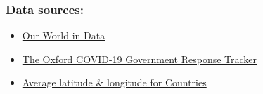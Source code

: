 \documentclass[
]{article}
\providecommand{\tightlist}{%
  \setlength{\itemsep}{0pt}\setlength{\parskip}{0pt}}
\begin{document}
\hypertarget{data-sources}{%
\subsubsection{Data sources:}\label{data-sources}}

\begin{itemize}
\tightlist
\item
  \href{https://covid.ourworldindata.org/data/owid-covid-data.csv}{Our
  World in Data}
\item
  \href{https://raw.githubusercontent.com/OxCGRT/covid-policy-tracker/master/data/OxCGRT_latest.csv}{The
  Oxford COVID-19 Government Response Tracker}
\item
  \href{https://raw.githubusercontent.com/albertyw/avenews/master/old/data/average-latitude-longitude-countries.csv}{Average
  latitude \& longitude for Countries}
\end{itemize}
\end{document}
